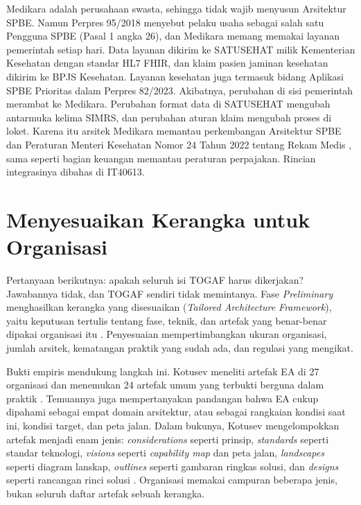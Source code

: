 \begin{kasus}[title={Kasus Medikara Health: Mengapa Perusahaan Swasta Membaca Arsitektur Pemerintah}]
Medikara adalah perusahaan swasta, sehingga tidak wajib menyusun Arsitektur
SPBE. Namun Perpres 95/2018 menyebut pelaku usaha sebagai salah satu Pengguna
SPBE (Pasal 1 angka 26), dan Medikara memang memakai layanan pemerintah
setiap hari. Data layanan dikirim ke SATUSEHAT milik Kementerian Kesehatan
dengan standar HL7 FHIR, dan klaim pasien jaminan kesehatan dikirim ke BPJS
Kesehatan. Layanan kesehatan juga termasuk bidang Aplikasi SPBE Prioritas
dalam Perpres 82/2023. Akibatnya, perubahan di sisi pemerintah merambat ke
Medikara. Perubahan format data di SATUSEHAT mengubah antarmuka kelima SIMRS,
dan perubahan aturan klaim mengubah proses di loket. Karena itu arsitek
Medikara memantau perkembangan Arsitektur SPBE dan Peraturan Menteri
Kesehatan Nomor 24 Tahun 2022 tentang Rekam Medis \cite{permenkes24-2022},
sama seperti bagian keuangan memantau peraturan perpajakan. Rincian
integrasinya dibahas di IT40613.
\end{kasus}

\section{Menyesuaikan Kerangka untuk Organisasi}

Pertanyaan berikutnya: apakah seluruh isi TOGAF harus dikerjakan? Jawabannya
tidak, dan TOGAF sendiri tidak memintanya. Fase \textit{Preliminary}
menghasilkan kerangka yang disesuaikan (\textit{Tailored Architecture
Framework}), yaitu keputusan tertulis tentang fase, teknik, dan artefak yang
benar-benar dipakai organisasi itu \cite{c02-togaf-pocket}. Penyesuaian
mempertimbangkan ukuran organisasi, jumlah arsitek, kematangan praktik yang
sudah ada, dan regulasi yang mengikat.

Bukti empiris mendukung langkah ini. Kotusev meneliti artefak EA di 27
organisasi dan menemukan 24 artefak umum yang terbukti berguna dalam praktik
\cite{kotusev2019}. Temuannya juga mempertanyakan pandangan bahwa EA cukup
dipahami sebagai empat domain arsitektur, atau sebagai rangkaian kondisi saat
ini, kondisi target, dan peta jalan. Dalam bukunya, Kotusev mengelompokkan
artefak menjadi enam jenis: \textit{considerations} seperti prinsip,
\textit{standards} seperti standar teknologi, \textit{visions} seperti
\textit{capability map} dan peta jalan, \textit{landscapes} seperti diagram
lanskap, \textit{outlines} seperti gambaran ringkas solusi, dan
\textit{designs} seperti rancangan rinci solusi \cite{kotusev2021}. Organisasi
memakai campuran beberapa jenis, bukan seluruh daftar artefak sebuah
kerangka.

